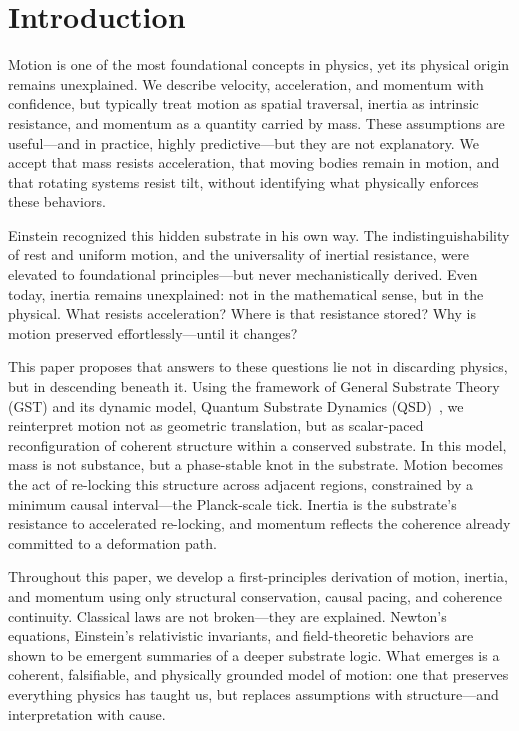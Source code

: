 \documentclass[entropy,article,submit,pdftex,moreauthors]{Definitions/mdpi}
\begin{document}

\section{Introduction}
Motion is one of the most foundational concepts in physics, yet its physical origin remains unexplained. We describe velocity, acceleration, and momentum with confidence, but typically treat motion as spatial traversal, inertia as intrinsic resistance, and momentum as a quantity carried by mass. These assumptions are useful—and in practice, highly predictive—but they are not explanatory. We accept that mass resists acceleration, that moving bodies remain in motion, and that rotating systems resist tilt, without identifying what physically enforces these behaviors.

Einstein recognized this hidden substrate in his own way. The indistinguishability of rest and uniform motion, and the universality of inertial resistance, were elevated to foundational principles—but never mechanistically derived. Even today, inertia remains unexplained: not in the mathematical sense, but in the physical. What resists acceleration? Where is that resistance stored? Why is motion preserved effortlessly—until it changes?

This paper proposes that answers to these questions lie not in discarding physics, but in descending beneath it. Using the framework of General Substrate Theory (GST) and its dynamic model, Quantum Substrate Dynamics (QSD)~\cite{bush2025,bush-planck-2025,bush-coherence,bush-planck-ep}, we reinterpret motion not as geometric translation, but as scalar-paced reconfiguration of coherent structure within a conserved substrate. In this model, mass is not substance, but a phase-stable knot in the substrate. Motion becomes the act of re-locking this structure across adjacent regions, constrained by a minimum causal interval—the Planck-scale tick. Inertia is the substrate’s resistance to accelerated re-locking, and momentum reflects the coherence already committed to a deformation path.

Throughout this paper, we develop a first-principles derivation of motion, inertia, and momentum using only structural conservation, causal pacing, and coherence continuity. Classical laws are not broken—they are explained. Newton’s equations, Einstein’s relativistic invariants, and field-theoretic behaviors are shown to be emergent summaries of a deeper substrate logic. What emerges is a coherent, falsifiable, and physically grounded model of motion: one that preserves everything physics has taught us, but replaces assumptions with structure—and interpretation with cause.
\end{document}
